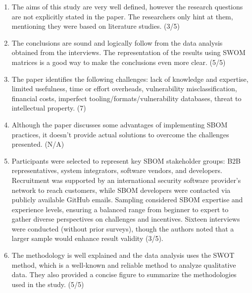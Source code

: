 \begin{enumerate}
    \item The aims of this study are very well defined, however the research questions are not explicitly stated in the paper. The researchers only hint at them, mentioning they were based on literature studies. (3/5)
    \item The conclusions are sound and logically follow from the data analysis obtained from the interviews. The representation of the results using SWOM matrices is a good way to make the conclusions even more clear. (5/5)
    \item The paper identifies the following challenges: lack of knowledge and expertise, limited usefulness, time or effort overheads, vulnerability misclassification, financial costs, imperfect tooling/formats/vulnerability databases, threat to intellectual property. (7)
    \item Although the paper discusses some advantages of implementing SBOM practices, it doesn't provide actual solutions to overcome the challenges presented. (N/A)
    \item Participants were selected to represent key SBOM stakeholder groups: B2B representatives, system integrators, software vendors, and developers. Recruitment was supported by an international security software provider's network to reach customers, while SBOM developers were contacted via publicly available GitHub emails. Sampling considered SBOM expertise and experience levels, ensuring a balanced range from beginner to expert to gather diverse perspectives on challenges and incentives. Sixteen interviews were conducted (without prior surveys), though the authors noted that a larger sample would enhance result validity (3/5).
    \item The methodology is well explained and the data analysis uses the SWOT method, which is a well-known and reliable method to analyze qualitative data. They also provided a concise figure to summarize the methodologies used in the study. (5/5)
\end{enumerate}

